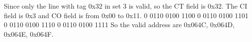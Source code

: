 \documentclass{article}
\begin{document}
Since only the line with tag 0x32 in set 3 is valid, so the CT field
is 0x32. The CI field is 0x3 and CO field is from 0x00 to 0x11.
0 0110 0100 1100
0 0110 0100 1101
0 0110 0100 1110
0 0110 0100 1111
So the valid address are 0x064C, 0x064D, 0x064E, 0x064F.
\end{document}
